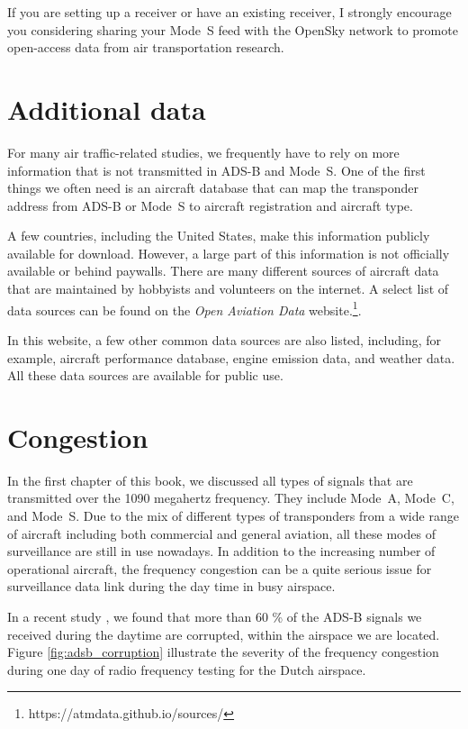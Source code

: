 If you are setting up a receiver or have an existing receiver, I strongly encourage you considering sharing your Mode~S feed with the OpenSky network to promote open-access data from air transportation research.

\section{Additional data}

For many air traffic-related studies, we frequently have to rely on more information that is not transmitted in ADS-B and Mode~S. One of the first things we often need is an aircraft database that can map the transponder address from ADS-B or Mode~S to aircraft registration and aircraft type. 

A few countries, including the United States, make this information publicly available for download. However, a large part of this information is not officially available or behind paywalls. There are many different sources of aircraft data that are maintained by hobbyists and volunteers on the internet. A select list of data sources can be found on the \emph{Open Aviation Data} website.\footnote{https://atmdata.github.io/sources/}.

In this website, a few other common data sources are also listed, including, for example, aircraft performance database, engine emission data, and weather data. All these data sources are available for public use.


\section{Congestion}
In the first chapter of this book, we discussed all types of signals that are transmitted over the 1090 megahertz frequency. They include Mode~A, Mode~C, and Mode~S. Due to the mix of different types of transponders from a wide range of aircraft including both commercial and general aviation, all these modes of surveillance are still in use nowadays. In addition to the increasing number of operational aircraft, the frequency congestion can be a quite serious issue for surveillance data link during the day time in busy airspace. 

In a recent study \cite{sun2020rf}, we found that more than 60 \% of the ADS-B signals we received during the daytime are corrupted, within the airspace we are located. Figure \ref{fig:adsb_corruption} illustrate the severity of the frequency congestion during one day of radio frequency testing for the Dutch airspace.


